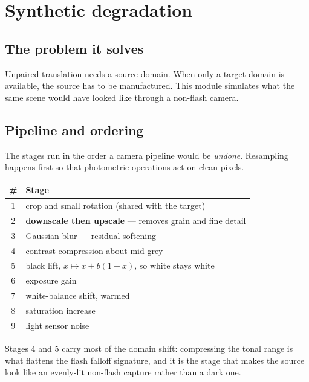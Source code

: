 \documentclass[11pt,a4paper]{article}
\begin{document}
\section{Synthetic degradation}
\label{sec:degrade}

\subsection{The problem it solves}

Unpaired translation needs a source domain. When only a target domain is
available, the source has to be manufactured. This module simulates what the
same scene would have looked like through a non-flash camera.

\subsection{Pipeline and ordering}

The stages run in the order a camera pipeline would be \emph{undone}. Resampling
happens first so that photometric operations act on clean pixels.

\begin{center}
\begin{tabular}{@{}cl@{}}
\toprule
\# & Stage \\
\midrule
1 & crop and small rotation (shared with the target) \\
2 & \textbf{downscale then upscale} --- removes grain and fine detail \\
3 & Gaussian blur --- residual softening \\
4 & contrast compression about mid-grey \\
5 & black lift, $x \mapsto x + b(1-x)$, so white stays white \\
6 & exposure gain \\
7 & white-balance shift, warmed \\
8 & saturation increase \\
9 & light sensor noise \\
\bottomrule
\end{tabular}
\end{center}

Stages 4 and 5 carry most of the domain shift: compressing the tonal range is
what flattens the flash falloff signature, and it is the stage that makes the
source look like an evenly-lit non-flash capture rather than a dark one.
\end{document}
